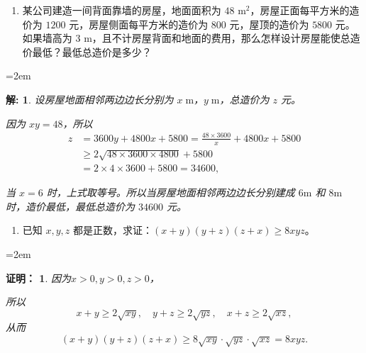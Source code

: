 \documentclass[aspectratio=169,13pt,fleqn,t] {beamer}
\newtheorem*{prooft}{证明：}
\newtheorem*{solve}{解:}
\begin{document}
\begin{frame}
	\begin{enumerate}[5.]
		 \item 某公司建造一间背面靠墙的房屋，地面面积为 \(48\text{ m}^2\)，房屋正面每平方米的造价为 \(1200\) 元，房屋侧面每平方米的造价为 \(800\) 元，屋顶的造价为 \(5800\) 元。如果墙高为 \(3\text{ m}\)，且不计房屋背面和地面的费用，那么怎样设计房屋能使总造价最低？最低总造价是多少？
	\end{enumerate}
	
	\leftskip=2em
	\begin{minipage}{0.8\textwidth}
		
		\begin{solve}
		设房屋地面相邻两边边长分别为 \(x\;\mathrm{ m}\)，\(y\;\mathrm{ m}\)，总造价为 \(z\) 元。
		
		因为 \(xy = 48\)，所以
		\vspace{-1ex}	
		\begin{align*}
			z &= 3600y + 4800x + 5800 = \frac{48 \times 3600}{x} + 4800x + 5800\\
			&\geqslant 2\sqrt{48 \times 3600 \times 4800} + 5800 \\
			&= 2 \times 4 \times 3600 + 5800 = 34600,
		\end{align*}
		
		\vspace{-1em}
		  当 \(x = 6\) 时，上式取等号。所以当房屋地面相邻两边边长分别建成 $6 \mathrm{m}$ 和 $8\mathrm{m}$ 时，造价最低，最低总造价为 $34600$ 元。
		\end{solve}
	\end{minipage}
	
\end{frame}

\begin{frame}
	\begin{enumerate}[6.]
		\item 已知 \(x, y, z\) 都是正数，求证：\((x+y)(y+z)(z+x) \geqslant 8xyz\)。
	\end{enumerate}
	
	\leftskip=2em
	\begin{minipage}{0.8\textwidth}
		
		\begin{prooft}
			因为\(x > 0, y > 0, z > 0\)，
			
			所以
			\[x + y \geqslant 2\sqrt{xy},\quad y + z \geqslant 2\sqrt{yz},\quad x + z \geqslant 2\sqrt{xz},\]
			从而 
			\[(x+y)(y+z)(z+x) \geqslant 8\sqrt{xy} \cdot \sqrt{yz} \cdot \sqrt{xz} = 8xyz.\]
		\end{prooft}
	\end{minipage}
	
\end{frame}
\end{document}
